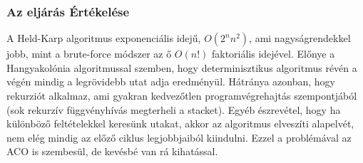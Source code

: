 \subsubsection{Az eljárás Értékelése}
A Held-Karp algoritmus exponenciális idejű, \(O(2^nn^2)\), ami nagyságrendekkel jobb, mint a brute-force módszer az ő \(O(n!)\) faktoriális idejével. Előnye a Hangyakolónia algoritmussal szemben, hogy determinisztikus algoritmus révén a végén mindig a legrövidebb utat adja eredményül. Hátránya azonban, hogy rekurziót alkalmaz, ami gyakran kedvezőtlen programvégrehajtás szempontjából (sok rekurzív függvényhívás megterheli a stacket). Egyéb észrevétel, hogy ha különböző feltételekkel keresünk utakat, akkor az algoritmus elveszíti alapelvét, nem elég mindig az előző ciklus legjobbjaiból kiindulni. Ezzel a problémával az ACO is szembesül, de kevésbé van rá kihatással.